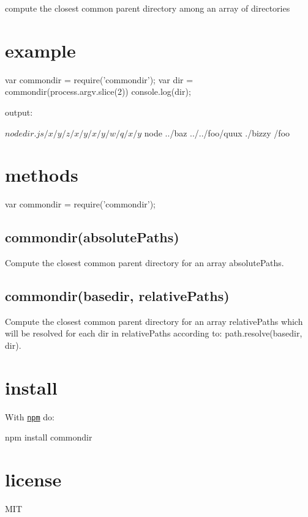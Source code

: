 compute the closest common parent directory among an array of directories

\section*{example}


\begin{DoxyCode}
var commondir = require('commondir');
var dir = commondir(process.argv.slice(2))
console.log(dir);
\end{DoxyCode}


output\+:


\begin{DoxyCode}
$ node dir.js /x/y/z /x/y /x/y/w/q
/x/y
$ node ../baz ../../foo/quux ./bizzy
/foo
\end{DoxyCode}


\section*{methods}


\begin{DoxyCode}
var commondir = require('commondir');
\end{DoxyCode}


\subsection*{commondir(absolute\+Paths)}

Compute the closest common parent directory for an array {\ttfamily absolute\+Paths}.

\subsection*{commondir(basedir, relative\+Paths)}

Compute the closest common parent directory for an array {\ttfamily relative\+Paths} which will be resolved for each {\ttfamily dir} in {\ttfamily relative\+Paths} according to\+: {\ttfamily path.\+resolve(basedir, dir)}.

\section*{install}

With \href{https://npmjs.org}{\tt npm} do\+:


\begin{DoxyCode}
npm install commondir
\end{DoxyCode}


\section*{license}

M\+IT 